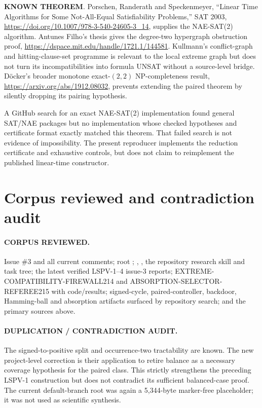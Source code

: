 \documentclass[11pt]{article}
\newcommand{\KNOWN}{\textbf{KNOWN THEOREM}}
\begin{document}
\KNOWN.  Porschen, Randerath and Speckenmeyer, ``Linear Time Algorithms for
Some Not-All-Equal Satisfiability Problems,'' SAT 2003,
\url{https://doi.org/10.1007/978-3-540-24605-3_14}, supplies the NAE-SAT(2)
algorithm.  Antunes Filho's thesis gives the degree-two hypergraph obstruction
proof,
\url{https://dspace.mit.edu/handle/1721.1/144581}.  Kullmann's conflict-graph
and hitting-clause-set programme is relevant to the local extreme graph but
does not turn its incompatibilities into formula UNSAT without a source-level
bridge.  Döcker's broader monotone exact-$(2,2)$ NP-completeness result,
\url{https://arxiv.org/abs/1912.08032}, prevents extending the paired theorem
by silently dropping its pairing hypothesis.

A GitHub search for an exact NAE-SAT(2) implementation found general SAT/NAE
packages but no implementation whose checked hypotheses and certificate
format exactly matched this theorem.  That failed search is not evidence of
impossibility.  The present reproducer implements the reduction certificate
and exhaustive controls, but does not claim to reimplement the published
linear-time constructor.

\section{Corpus reviewed and contradiction audit}

\paragraph{CORPUS REVIEWED.}
Issue \#3 and all current comments; root ; ,
, the repository research skill and task tree; the latest
verified LSPV-1--4 issue-3 reports; EXTREME-COMPATIBILITY-FIREWALL214 and
ABSORPTION-SELECTOR-REFEREE215 with code/results; signed-cycle, paired-controller,
backdoor, Hamming-ball and absorption artifacts surfaced by repository search;
and the primary sources above.

\paragraph{DUPLICATION / CONTRADICTION AUDIT.}
The signed-to-positive split and occurrence-two tractability are known.  The
new project-level correction is their application to retire balance as a
necessary coverage hypothesis for the paired class.  This strictly strengthens
the preceding LSPV-1 construction but does not contradict its sufficient
balanced-case proof.  The current default-branch root was again a 5,344-byte
marker-free placeholder; it was not used as scientific synthesis.
\end{document}
